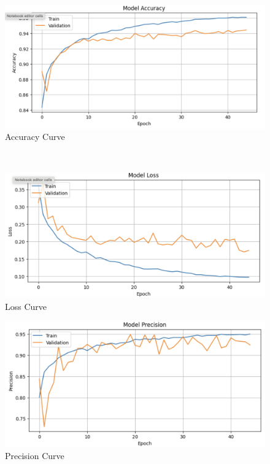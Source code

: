 \begin{figure}[H]
    \centering
    \includegraphics[width=1\textwidth]{figs/Accuracy.png}
    \caption{Accuracy Curve}
    \label{accuracy}
\end{figure}

\\

\begin{figure}[H]
    \centering
    \includegraphics[width=1\textwidth]{figs/Loss.png}
    \caption{Loss Curve}
    \label{loss}
\end{figure}

\begin{figure}[H]
    \centering
    \includegraphics[width=1\textwidth]{figs/Precision.png}
    \caption{Precision Curve}
    \label{precision}
\end{figure}

